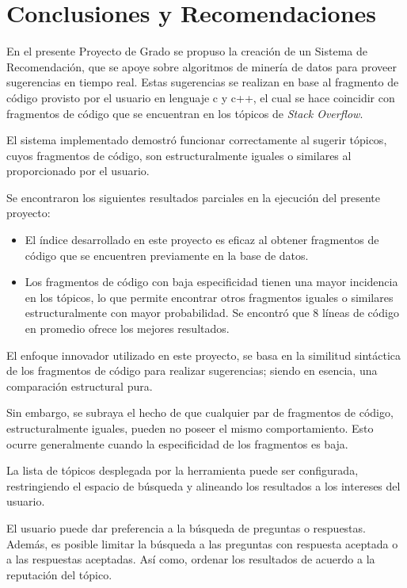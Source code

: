\chapter*{Conclusiones y Recomendaciones}

En el presente Proyecto de Grado se propuso la creación de un Sistema de Recomendación,
que se apoye sobre algoritmos de minería de datos para proveer sugerencias en tiempo real.
Estas sugerencias se realizan en base al fragmento de código provisto por el usuario en lenguaje c y c++,
el cual se hace coincidir con fragmentos de código que se encuentran en los tópicos de \textit{Stack Overflow}.

El sistema implementado demostró funcionar correctamente al sugerir tópicos,
cuyos fragmentos de código, son estructuralmente iguales o similares al proporcionado por el usuario.

Se encontraron los siguientes resultados parciales en la ejecución del presente proyecto:

\begin{itemize}
  \item El índice desarrollado en este proyecto es eficaz al obtener fragmentos de código que se encuentren previamente en la base de datos.
  \item Los fragmentos de código con baja especificidad tienen una mayor incidencia en los tópicos,
  lo que permite encontrar otros fragmentos iguales o similares estructuralmente con mayor probabilidad.
  Se encontró que $8$ líneas de código en promedio ofrece los mejores resultados.
\end{itemize}

El enfoque innovador utilizado en este proyecto,
se basa en la similitud sintáctica de los fragmentos de código para realizar sugerencias;
siendo en esencia, una comparación estructural pura.

Sin embargo, se subraya el hecho de que cualquier par de fragmentos de código,
estructuralmente iguales, pueden no poseer el mismo comportamiento.
Esto ocurre generalmente cuando la especificidad de los fragmentos es baja.

La lista de tópicos desplegada por la herramienta puede ser configurada,
restringiendo el espacio de búsqueda y alineando los resultados a los intereses del usuario.

El usuario puede dar preferencia a la búsqueda de preguntas o respuestas.
Además, es posible limitar la búsqueda a las preguntas con respuesta aceptada o a las respuestas aceptadas.
Así como, ordenar los resultados de acuerdo a la reputación del tópico.


